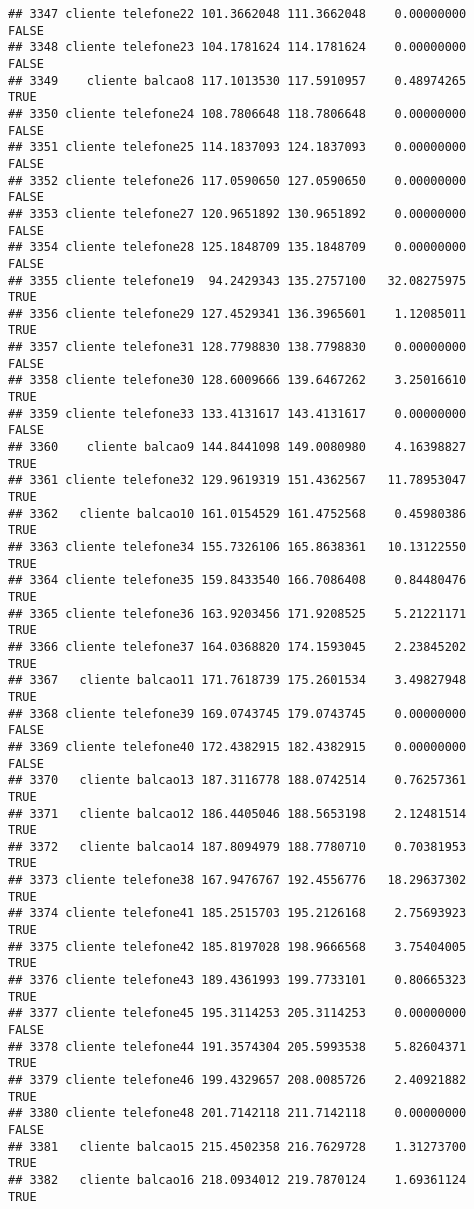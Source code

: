 \documentclass[
]{article}
\begin{document}
\begin{verbatim}
## 3347 cliente telefone22 101.3662048 111.3662048    0.00000000    FALSE
## 3348 cliente telefone23 104.1781624 114.1781624    0.00000000    FALSE
## 3349    cliente balcao8 117.1013530 117.5910957    0.48974265     TRUE
## 3350 cliente telefone24 108.7806648 118.7806648    0.00000000    FALSE
## 3351 cliente telefone25 114.1837093 124.1837093    0.00000000    FALSE
## 3352 cliente telefone26 117.0590650 127.0590650    0.00000000    FALSE
## 3353 cliente telefone27 120.9651892 130.9651892    0.00000000    FALSE
## 3354 cliente telefone28 125.1848709 135.1848709    0.00000000    FALSE
## 3355 cliente telefone19  94.2429343 135.2757100   32.08275975     TRUE
## 3356 cliente telefone29 127.4529341 136.3965601    1.12085011     TRUE
## 3357 cliente telefone31 128.7798830 138.7798830    0.00000000    FALSE
## 3358 cliente telefone30 128.6009666 139.6467262    3.25016610     TRUE
## 3359 cliente telefone33 133.4131617 143.4131617    0.00000000    FALSE
## 3360    cliente balcao9 144.8441098 149.0080980    4.16398827     TRUE
## 3361 cliente telefone32 129.9619319 151.4362567   11.78953047     TRUE
## 3362   cliente balcao10 161.0154529 161.4752568    0.45980386     TRUE
## 3363 cliente telefone34 155.7326106 165.8638361   10.13122550     TRUE
## 3364 cliente telefone35 159.8433540 166.7086408    0.84480476     TRUE
## 3365 cliente telefone36 163.9203456 171.9208525    5.21221171     TRUE
## 3366 cliente telefone37 164.0368820 174.1593045    2.23845202     TRUE
## 3367   cliente balcao11 171.7618739 175.2601534    3.49827948     TRUE
## 3368 cliente telefone39 169.0743745 179.0743745    0.00000000    FALSE
## 3369 cliente telefone40 172.4382915 182.4382915    0.00000000    FALSE
## 3370   cliente balcao13 187.3116778 188.0742514    0.76257361     TRUE
## 3371   cliente balcao12 186.4405046 188.5653198    2.12481514     TRUE
## 3372   cliente balcao14 187.8094979 188.7780710    0.70381953     TRUE
## 3373 cliente telefone38 167.9476767 192.4556776   18.29637302     TRUE
## 3374 cliente telefone41 185.2515703 195.2126168    2.75693923     TRUE
## 3375 cliente telefone42 185.8197028 198.9666568    3.75404005     TRUE
## 3376 cliente telefone43 189.4361993 199.7733101    0.80665323     TRUE
## 3377 cliente telefone45 195.3114253 205.3114253    0.00000000    FALSE
## 3378 cliente telefone44 191.3574304 205.5993538    5.82604371     TRUE
## 3379 cliente telefone46 199.4329657 208.0085726    2.40921882     TRUE
## 3380 cliente telefone48 201.7142118 211.7142118    0.00000000    FALSE
## 3381   cliente balcao15 215.4502358 216.7629728    1.31273700     TRUE
## 3382   cliente balcao16 218.0934012 219.7870124    1.69361124     TRUE

\end{verbatim}
\end{document}
